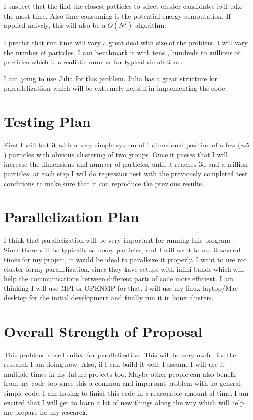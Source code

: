 \documentclass[11pt]{article}
\begin{document}
I suspect that the find the closest patticles to select cluster candidates iwll take the most time. Also time consuming is the potential energy computation. If applied naively, this will also be a $O(N^2)$ algorithm. 

I predict that run time will vary a great deal with size of the problem. I will vary the number of particles. I can benchmark it with tens , hundreds to millions of particles which is a realistic number for typical simulations.

I am going to use Julia for this problem. Julia has a great structure for parrallelizatiion which will be extremely helpful in implementing the code.

\section{Testing Plan} 

First I will test it with a very simple system of 1 dimesional position of a few ($\sim$5 ) particles with obvious clustering of two groups. Once it passes that I will increase the dimensions and number of particles, until it reaches 3d and a million particles. at each step I will do regression test with the previously completed test conditions to make sure that it can reproduce the previous results.

\section{Parallelization Plan}
I think that parallelization will be very important for running this program . Since there will be typically so many particles, and I will want to use it several times for my project, it would be ideal to paralleize it properly. I want to use rcc cluster formy parallelization, since they have setups with infini bands which will help the communications between different parts of code more efficient. I am thinking I will use MPI or OPENMP for that.
I will use my linux laptop/Mac desktop for the initial development and finally run it in lionx clusters.

\section{Overall Strength of Proposal}

This problem is well suited for parallelization. This will be very useful for the research I am doing now. Also, if I can build it well, I assume I will use it multiple times in my future projects too. Maybe other people can also benefir from my code too since this a common and important problem with no general simple code. I am hoping to finish this code in a reasonable amount of time. I am excited that I will get to learn a lot of new things along the way which will help me prepare for my research.
\end{document}
